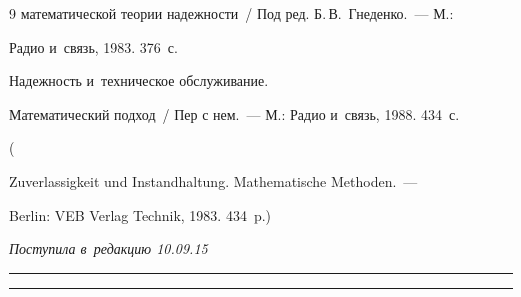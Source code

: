 {{\begin{thebibliography}{9}
математической теории надежности~/ Под ред. Б.\,В.~Гнеденко.~--- М.: 


Радио и~связь, 1983. 376~с. 










 Надежность и~техническое обслуживание. 


Математический подход~/ Пер с нем.~--- М.: Радио и~связь, 1988. 434~с.


(   


{Zuverlassigkeit und Instandhaltung. Mathematische Methoden}.~--- 


Berlin: VEB Verlag Technik, 1983. 434~p.)


     \end{thebibliography}


} }








\vspace*{-9pt}





\hfill{\small\textit{Поступила в~редакцию 10.09.15}}














\vspace*{9pt}





\hrule





\vspace*{2pt}





\hrule
















